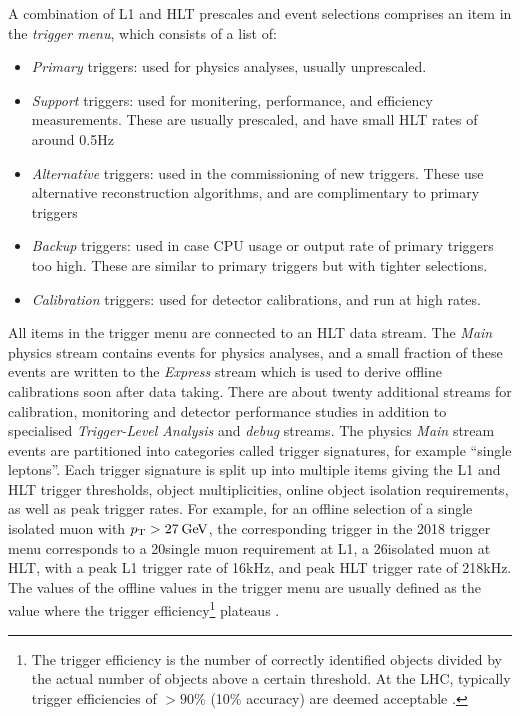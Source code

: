 A combination of L1 and HLT prescales and event selections comprises an item in the \textit{trigger menu}, which consists of a list of:
\begin{itemize}
    \item \textit{Primary} triggers: used for physics analyses, usually unprescaled.
    \item \textit{Support} triggers: used for monitering, performance, and efficiency measurements. These are usually prescaled, and have small HLT rates of around 0.5Hz
    \item \textit{Alternative} triggers: used in the commissioning of new triggers. These use alternative reconstruction algorithms, and are complimentary to primary triggers
    \item \textit{Backup} triggers: used in case CPU usage or output rate of primary triggers too high. These are similar to primary triggers but with tighter selections.
    \item \textit{Calibration} triggers: used for detector calibrations, and run at high rates. 
\end{itemize} 
All items in the trigger menu are connected to an HLT data stream. The \textit{Main} physics stream contains events for physics analyses, and a small fraction of these events are written to the \textit{Express} stream which is used to derive offline calibrations soon after data taking. There are about twenty additional streams for calibration, monitoring and detector performance studies in addition to specialised \textit{Trigger-Level Analysis} and \textit{debug} streams. The physics \textit{Main} stream events are partitioned into categories called trigger signatures, for example ``single leptons''. Each trigger signature is split up into multiple items giving the L1 and HLT trigger thresholds, object multiplicities, online object isolation requirements, as well as peak trigger rates. For example, for an offline selection of a single isolated muon with $p_{\text{T}}>27\hspace{2pt}\text{Ge\kern -0.1em V}$, the corresponding trigger in the 2018 trigger menu corresponds to a 20\GeV single muon requirement at L1, a 26\GeV isolated muon at HLT, with a peak L1 trigger rate of 16kHz, and peak HLT trigger rate of 218kHz. The values of the offline \pt values in the trigger menu are usually defined as the value where the trigger efficiency\footnote{The trigger efficiency is the number of correctly identified objects divided by the actual number of objects above a certain \pt threshold. At the LHC, typically trigger efficiencies of $>90\%$ (10\% accuracy) are deemed acceptable \cite{Atlas:triggeratlhc}.} plateaus \cite{Atlas:trigmenu}.

